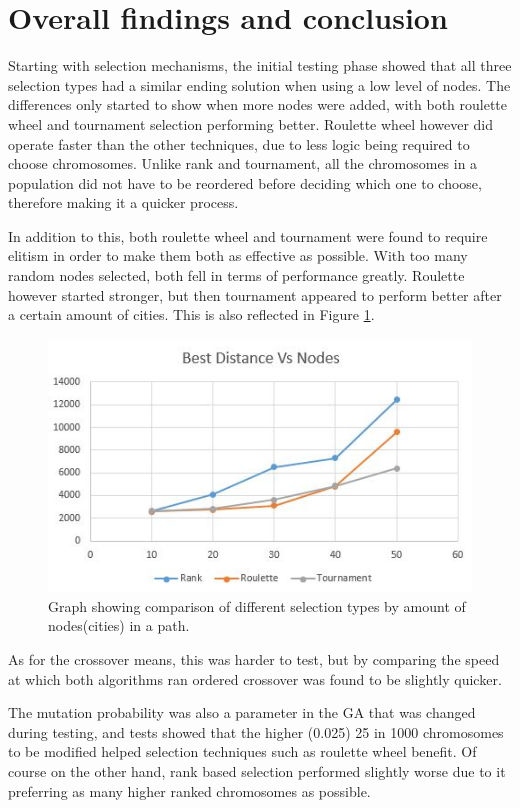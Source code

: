\documentclass[article]{IEEEtran}
\begin{document}
\section{Overall findings and conclusion}
Starting with selection mechanisms, the initial testing phase showed that all three selection types had a similar ending solution when using a low level of nodes. The differences only started to show when more nodes were added, with both roulette wheel and tournament selection performing better. Roulette wheel however did operate faster than the other techniques, due to less logic being required to choose chromosomes. Unlike rank and tournament, all the chromosomes in a population did not have to be reordered before deciding which one to choose, therefore making it a quicker process. \par
In addition to this, both roulette wheel and tournament were found to require elitism in order to make them both as effective as possible. With too many random nodes selected, both fell in terms of performance greatly. Roulette however started stronger, but then tournament appeared to perform better after a certain amount of cities. This is also reflected in Figure \ref{fig:20}. \par
\begin{figure}[H]
\centering
\includegraphics[width=.8\linewidth]{images/distances}
\caption{Graph showing comparison of different selection types by amount of nodes(cities) in a path.}
\label{fig:20}
\end{figure}
As for the crossover means, this was harder to test, but by comparing the speed at which both algorithms ran ordered crossover was found to be slightly quicker. \par
The mutation probability was also a parameter in the GA that was changed during testing, and tests showed that the higher (0.025) 25 in 1000 chromosomes to be modified helped selection techniques such as roulette wheel benefit. Of course on the other hand, rank based selection performed slightly worse due to it preferring as many higher ranked chromosomes as possible. \par
\end{document}
